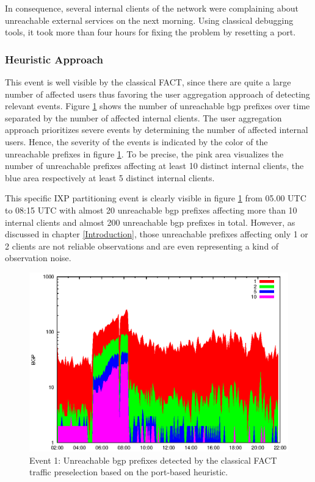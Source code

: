 In consequence, several internal clients of the \citet{switch} network were complaining about unreachable external services on the next morning. 
Using classical debugging tools, it took more than four hours for fixing the problem by resetting a port\citep{SchatzmannPAM2011}.

\subsubsection{Heuristic Approach} This event is well visible by the classical \gls{FACT}, since there are quite a large number of affected users thus favoring the user aggregation approach of detecting relevant events. 
Figure \ref{fig:AMS_IX_FACT_REF} shows the number of unreachable \gls{bgp} prefixes over time separated by the number of affected internal clients. 
The user aggregation approach prioritizes severe events by determining the number of affected internal users. 
Hence, the severity of the events is indicated by the color of the unreachable prefixes in figure \ref{fig:AMS_IX_FACT_REF}. 
To be precise, the pink area visualizes the number of unreachable prefixes affecting at least 10 distinct internal clients, the blue area respectively at least 5 distinct internal clients.

This specific IXP partitioning event is clearly visible in figure \ref{fig:AMS_IX_FACT_REF} from 05.00 UTC to 08:15 UTC with almost 20 unreachable \gls{bgp} prefixes affecting more than 10 internal clients and almost 200 unreachable \gls{bgp} prefixes in total. 
However, as discussed in chapter \ref{Introduction}, those unreachable prefixes affecting only 1 or 2 clients are not reliable observations and are even representing a kind of observation noise. 
\begin{figure}
	[p] \centering 
	\includegraphics[width=0.75\linewidth]{images/events/2010_03_25/bgp_log_port80_ref.eps} \caption{Event 1: Unreachable \gls{bgp} prefixes detected by the classical \gls{FACT} traffic preselection based on the port-based heuristic.} 
	\label{fig:AMS_IX_FACT_REF} 
\end{figure}

